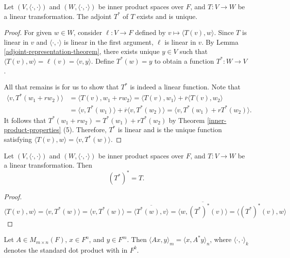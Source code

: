 \begin{thm}\label{adjoint-existence-uniqueness}
    Let $(V, \langle\cdot,\cdot\rangle)$ and $(W, \langle\cdot,\cdot\rangle)$ be inner product spaces over $F$, and $T: V \to W$ be a linear transformation. The adjoint $T^*$ of $T$ exists and is unique.
\end{thm}

\begin{proof}
    For given $w \in W$, consider $\ell: V \to F$ defined by $v \mapsto \langle T(v), w \rangle$. Since $T$ is linear in $v$ and $\langle\cdot,\cdot\rangle$ is linear in the first argument, $\ell$ is linear in $v$. By Lemma \ref{adjoint-representation-theorem}, there exists unique $y \in V$ such that $\langle T(v), w \rangle = \ell(v) = \langle v, y \rangle$. Define $T^*(w) = y$ to obtain a function $T^*: W \to V$.

    All that remains is for us to show that $T^*$ is indeed a linear function. Note that
    \begin{align*}
        \langle v, T^*(w_1 + rw_2) \rangle &= \langle T(v), w_1 + rw_2 \rangle = \langle T(v), w_1 \rangle + \overline{r}\langle T(v), w_2 \rangle \\
        &= \langle v, T^*(w_1) \rangle + \overline{r}\langle v, T^*(w_2) \rangle = \langle v, T^*(w_1) + rT^*(w_2) \rangle.
    \end{align*}
    It follows that $T^*(w_1 + rw_2) = T^*(w_1) + rT^*(w_2)$ by Theorem \ref{inner-product-properties} (5). Therefore, $T^*$ is linear and is the unique function satisfying $\langle T(v), w \rangle = \langle v, T^*(w) \rangle$.
\end{proof}

\begin{prop}\label{adjoint-is-involution}
    Let $(V, \langle\cdot,\cdot\rangle)$ and $(W, \langle\cdot,\cdot\rangle)$ be inner product spaces over $F$, and $T: V \to W$ be a linear transformation. Then
    \[(T^*)^* = T.\]
\end{prop}

\begin{proof}
    \[\langle T(v), w \rangle = \langle v, T^*(w) \rangle = \langle v, T^*(w) \rangle = \overline{\langle T^*(w), v \rangle} = \overline{\langle w, (T^*)^*(v) \rangle} = \langle (T^*)^*(v), w \rangle\]
\end{proof}

\begin{lemma}\label{standard-inner-product-adjoint}
    Let $A \in M_{m \times n}(F)$, $x \in F^n$, and $y \in F^m$. Then $\langle Ax, y \rangle_m = \langle x, A^{*}y \rangle_n$, where $\langle\cdot,\cdot\rangle_k$ denotes the standard dot product with in $F^k$.
\end{lemma}

